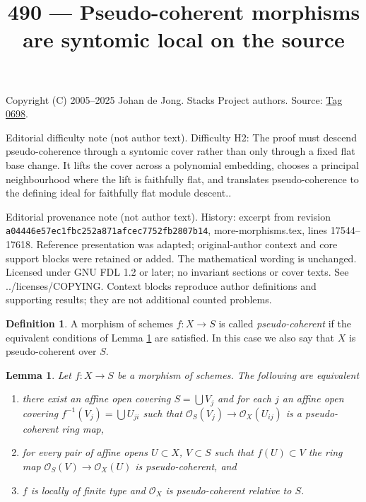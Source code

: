 \documentclass{amsart}
\theoremstyle{plain}
\newtheorem{lemma}[subsection]{Lemma}
\theoremstyle{definition}
\newtheorem{definition}[subsection]{Definition}
\theoremstyle{remark}
\numberwithin{equation}{subsection}
\begin{document}
\title[Stacks Project, Tag 0698]{490 --- Pseudo-coherent morphisms are syntomic local on the source}
\maketitle
\noindent Copyright (C) 2005--2025 Johan de Jong. Stacks Project authors. Source: \href{https://stacks.math.columbia.edu/tag/0698}{Tag 0698}.

\noindent Editorial difficulty note (not author text). Difficulty H2: The proof must descend pseudo-coherence through a syntomic cover rather than only through a fixed flat base change. It lifts the cover across a polynomial embedding, chooses a principal neighbourhood where the lift is faithfully flat, and translates pseudo-coherence to the defining ideal for faithfully flat module descent..

\noindent Editorial provenance note (not author text). History: excerpt from revision \texttt{a0444\allowbreak 6e57e\allowbreak c1fbc\allowbreak 252a8\allowbreak 71afc\allowbreak ec775\allowbreak 2fb28\allowbreak 07b14}, more-morphisms.tex, lines 17544--17618. Reference presentation was adapted; original-author context and core support blocks were retained or added. The mathematical wording is unchanged. Licensed under GNU FDL 1.2 or later; no invariant sections or cover texts. See ../licenses/COPYING. Context blocks reproduce author definitions and supporting results; they are not additional counted problems.

\begin{definition}
\label{definition-pseudo-coherent}
A morphism of schemes $f : X \to S$ is called {\it pseudo-coherent}
if the equivalent conditions of
Lemma \ref{lemma-pseudo-coherent}
are satisfied. In this case we also say that $X$ is pseudo-coherent
over $S$.
\end{definition}

\begin{lemma}
\label{lemma-pseudo-coherent}
Let $f : X \to S$ be a morphism of schemes. The following are equivalent
\begin{enumerate}
\item there exist an affine open covering $S = \bigcup V_j$ and for each $j$
an affine open covering $f^{-1}(V_j) = \bigcup U_{ji}$ such that
$\mathcal{O}_S(V_j) \to \mathcal{O}_X(U_{ij})$ is a pseudo-coherent
ring map,
\item for every pair of affine opens $U \subset X$, $V \subset S$
such that $f(U) \subset V$ the ring map
$\mathcal{O}_S(V) \to \mathcal{O}_X(U)$ is pseudo-coherent, and
\item $f$ is locally of finite type and $\mathcal{O}_X$
is pseudo-coherent relative to $S$.
\end{enumerate}
\end{lemma}
\end{document}
